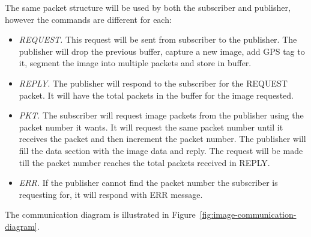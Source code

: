 The same packet structure will be used by both the subscriber and publisher, however the commands are different for each:
\begin{itemize}
	\item \textit{REQUEST.} This request will be sent from subscriber to the publisher. The publisher will drop the previous buffer, capture a new image, add GPS tag to it, segment the image into multiple packets and store in buffer.
	\item \textit{REPLY.} The publisher will respond to the subscriber for the REQUEST packet. It will have the total packets in the buffer for the image requested.
	\item \textit{PKT.} The subscriber will request image packets from the publisher using the packet number it wants. It will request the same packet number until it receives the packet and then increment the packet number. The publisher will fill the data section with the image data and reply. The request will be made till the packet number reaches the total packets received in REPLY.
	\item \textit{ERR.} If the publisher cannot find the packet number the subscriber is requesting for, it will respond with ERR message.
\end{itemize}

The communication diagram is illustrated in Figure~\ref{fig:image-communication-diagram}.

